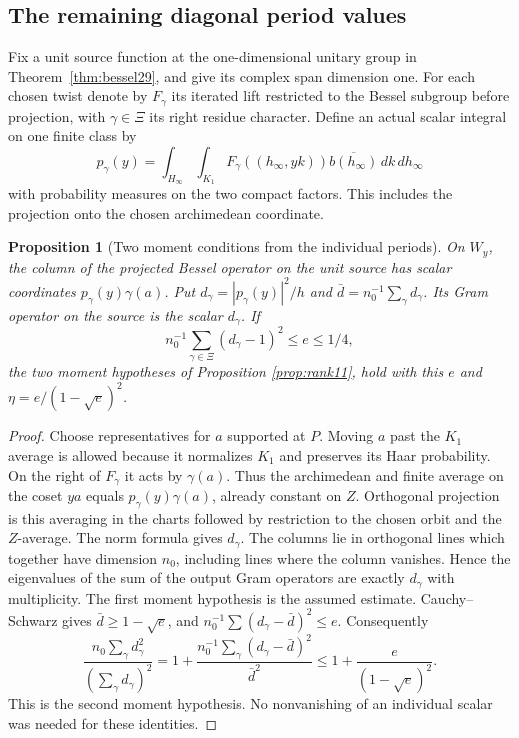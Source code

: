 \documentclass[a4paper,11pt]{article}
\newtheorem{proposition}{Proposition}[section]
\theoremstyle{definition}
\theoremstyle{remark}
\numberwithin{equation}{section}
\begin{document}
\subsection{The remaining diagonal period values}\label{nav:I-48}
\label{sec:diagonal32}

Fix a unit source function at the one-dimensional unitary group in Theorem~\ref{thm:bessel29}, and give its complex span dimension one. For each chosen twist denote by \(F_\gamma\) its iterated lift restricted to the Bessel subgroup before projection, with \(\gamma\in\Xi\) its right residue character. Define an actual scalar integral on one finite class by
\[
 p_\gamma(y)=\int_{H_\infty}\int_{K_1}F_\gamma((h_\infty,yk))
                      \overline{b(h_\infty)}\,dk\,dh_\infty
\]
with probability measures on the two compact factors. This includes the projection onto the chosen archimedean coordinate.

\begin{proposition}[Two moment conditions from the individual periods]\label{prop:diag32}
On \(W_y\), the column of the projected Bessel operator on the unit source has scalar coordinates \(p_\gamma(y)\gamma(a)\). Put \(d_\gamma=|p_\gamma(y)|^2/h\) and \(\bar d=n_0^{-1}\sum_\gamma d_\gamma\). Its Gram operator on the source is the scalar \(d_\gamma\). If 
\[
      n_0^{-1}\sum_{\gamma\in\Xi}(d_\gamma-1)^2\le e\le1/4,
\]
the two moment hypotheses of Proposition \ref{prop:rank11}, hold with this \(e\) and \(\eta=e/(1-\sqrt e)^2\).
\end{proposition}
\begin{proof}
Choose representatives for \(a\) supported at \(P\). Moving \(a\) past the \(K_1\) average is allowed because it normalizes \(K_1\) and preserves its Haar probability. On the right of \(F_\gamma\) it acts by \(\gamma(a)\). Thus the archimedean and finite average on the coset \(ya\) equals \(p_\gamma(y)\gamma(a)\), already constant on \(Z\). Orthogonal projection is this averaging in the charts followed by restriction to the chosen orbit and the \(Z\)-average. The norm formula gives \(d_\gamma\). The columns lie in orthogonal lines which together have dimension \(n_0\), including lines where the column vanishes. Hence the eigenvalues of the sum of the output Gram operators are exactly \(d_\gamma\) with multiplicity. The first moment hypothesis is the assumed estimate. Cauchy--Schwarz gives \(\bar d\ge1-\sqrt e\), and \(n_0^{-1}\sum(d_\gamma-\bar d)^2\le e\). Consequently
\[
  \frac{n_0\sum_\gamma d_\gamma^2}{(\sum_\gamma d_\gamma)^2}
       =1+\frac{n_0^{-1}\sum_\gamma(d_\gamma-\bar d)^2}{\bar d^2}
       \le 1+\frac e{(1-\sqrt e)^2}.
\]
This is the second moment hypothesis. No nonvanishing of an individual scalar was needed for these identities.
\end{proof}
\end{document}
